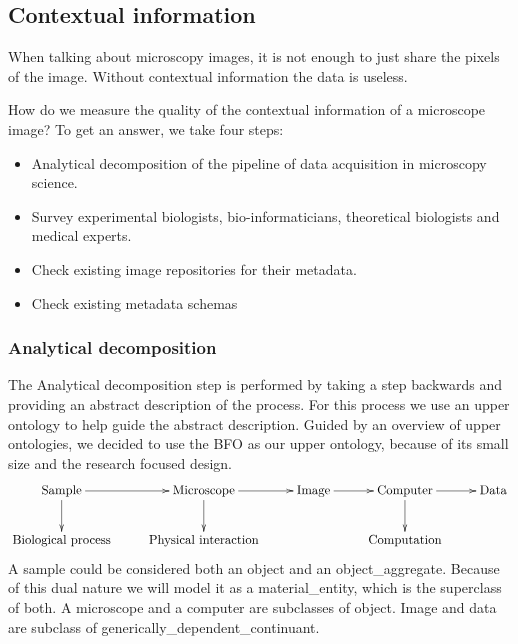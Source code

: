 \subsection{Contextual information}

When talking about microscopy images, it is
not enough to just share the pixels of the
image. Without contextual
information the data is useless.

How do we measure the quality of the contextual information of a
microscope image? To get an answer, we take four steps:
\begin{itemize}
\item Analytical decomposition of the
  pipeline of data acquisition
  in microscopy science.
\item Survey experimental biologists, bio-informaticians, theoretical
  biologists and medical experts.
\item Check existing image repositories for
  their metadata.
\item Check existing metadata schemas
\end{itemize}

\subsubsection{Analytical decomposition}

The Analytical decomposition
step is performed by taking a
step backwards and providing an abstract description of the
process. For this process we use an upper
ontology
to help guide the abstract description. Guided by an overview of upper
ontologies\cite{mascardi2007comparison}, we decided to use the
BFO\cite{grenon2004biodynamic} as our upper ontology, because of its
small size and the research focused design.
\begin{displaymath}
  \xymatrix{\text{Sample} \ar[d] \ar[r] & \text{Microscope} \ar[d]
    \ar[r] & \text{Image} \ar[r] & \text{Computer} \ar[d] \ar[r] &
    \text{Data} \\ \text{Biological process} & \text{Physical
      interaction} & & \text{Computation} & }
\end{displaymath}
A sample could be considered both an
object and an
object\_aggregate. Because of this dual nature
we will model it as a material\_entity, which
is the superclass of both. A microscope and a
computer are subclasses of
object. Image and data are
subclass of
generically\_dependent\_continuant.

